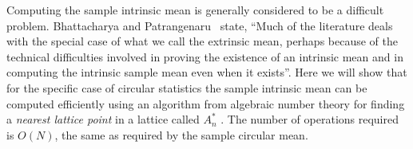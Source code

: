 \documentclass[journal]{../bib/IEEEtran}
\begin{document}

Computing the sample intrinsic mean is generally considered to be a difficult problem. Bhattacharya and Patrangenaru~\cite{Bhattacharya_int_ext_means_2005} state, ``Much of the literature deals with the special case of what we call the extrinsic mean, perhaps because of the technical difficulties involved in proving the existence of an intrinsic mean and in computing the intrinsic sample mean even when it exists''.  Here we will show that for the specific case of circular statistics the sample intrinsic mean can be computed efficiently using an algorithm from algebraic number theory for finding a \emph{nearest lattice point} in a lattice called $A_n^*$ \cite{McKilliam2009CoxeterLattices,McKilliam2008b,McKilliam2008,SPLAG,Conway1982FastQuantDec,Martinet2003}. The number of operations required is $O(N)$, the same as required by the sample circular mean.

\end{document}
